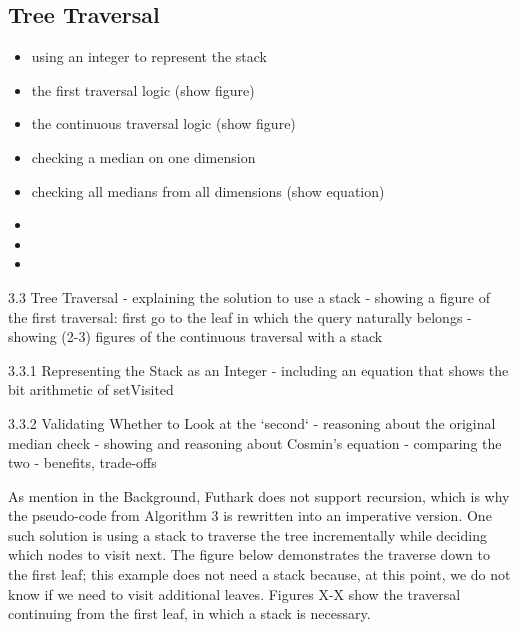 \subsection{Tree Traversal}
\label{sec:traversal}


\begin{itemize}
	\item using an integer to represent the stack
	\item the first traversal logic (show figure)
	\item the continuous traversal logic (show figure)
	\item checking a median on one dimension
	\item checking all medians from all dimensions (show equation)
	\item 
	\item 
	\item 
\end{itemize}	

  3.3 Tree Traversal
    - explaining the solution to use a stack 
    - showing a figure of the first traversal: first go to the leaf in which the query naturally belongs 
    - showing (2-3) figures of the continuous traversal with a stack

    3.3.1 Representing the Stack as an Integer
      - including an equation that shows the bit arithmetic of setVisited

    3.3.2 Validating Whether to Look at the `second`
      - reasoning about the original median check
      - showing and reasoning about Cosmin's equation
      - comparing the two
        - benefits, trade-offs



As mention in the Background, Futhark does not support recursion, which is why the pseudo-code from Algorithm 3 is rewritten into an imperative version. One such solution is using a stack to traverse the tree incrementally while deciding which nodes to visit next. The figure below demonstrates the traverse down to the first leaf; this example does not need a stack because, at this point, we do not know if we need to visit additional leaves. Figures X-X show the traversal continuing from the first leaf, in which a stack is necessary. 





